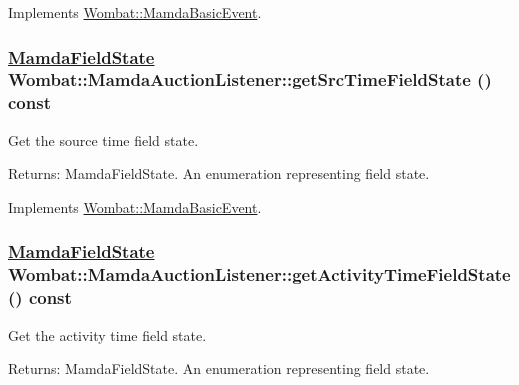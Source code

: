 Implements \hyperlink{classWombat_1_1MamdaBasicEvent_c361c99af2cf7eb9f5621d89f744fc62}{Wombat::Mamda\-Basic\-Event}.\hypertarget{classWombat_1_1MamdaAuctionListener_147fd8bbd8cdd66a644d84146e9fda34}{
\subsubsection[getSrcTimeFieldState]{\setlength{\rightskip}{0pt plus 5cm}\hyperlink{namespaceWombat_93aac974f2ab713554fd12a1fa3b7d2a}{Mamda\-Field\-State} Wombat::Mamda\-Auction\-Listener::get\-Src\-Time\-Field\-State () const}}
\label{classWombat_1_1MamdaAuctionListener_147fd8bbd8cdd66a644d84146e9fda34}


Get the source time field state. 

\begin{Desc}
\item[Returns:]Mamda\-Field\-State. An enumeration representing field state. \end{Desc}


Implements \hyperlink{classWombat_1_1MamdaBasicEvent_9cd58f3d7b5ebea42fa86e5dde46ab18}{Wombat::Mamda\-Basic\-Event}.\hypertarget{classWombat_1_1MamdaAuctionListener_f45aaa5aebbae7e326da900ea11c8422}{
\subsubsection[getActivityTimeFieldState]{\setlength{\rightskip}{0pt plus 5cm}\hyperlink{namespaceWombat_93aac974f2ab713554fd12a1fa3b7d2a}{Mamda\-Field\-State} Wombat::Mamda\-Auction\-Listener::get\-Activity\-Time\-Field\-State () const}}
\label{classWombat_1_1MamdaAuctionListener_f45aaa5aebbae7e326da900ea11c8422}


Get the activity time field state. 

\begin{Desc}
\item[Returns:]Mamda\-Field\-State. An enumeration representing field state. \end{Desc}


